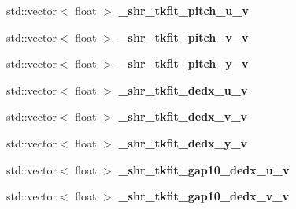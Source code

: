 \begin{DoxyCompactItemize}
\item 
std\+::vector$<$ float $>$ {\bfseries \+\_\+shr\+\_\+tkfit\+\_\+pitch\+\_\+u\+\_\+v}\hypertarget{classanalysis_1_1ShowerAnalysis_ab01e9544a4ca4faaa3331d4f3e731b17}{}\label{classanalysis_1_1ShowerAnalysis_ab01e9544a4ca4faaa3331d4f3e731b17}

\item 
std\+::vector$<$ float $>$ {\bfseries \+\_\+shr\+\_\+tkfit\+\_\+pitch\+\_\+v\+\_\+v}\hypertarget{classanalysis_1_1ShowerAnalysis_ad07e3ce7645736113700026b8984e838}{}\label{classanalysis_1_1ShowerAnalysis_ad07e3ce7645736113700026b8984e838}

\item 
std\+::vector$<$ float $>$ {\bfseries \+\_\+shr\+\_\+tkfit\+\_\+pitch\+\_\+y\+\_\+v}\hypertarget{classanalysis_1_1ShowerAnalysis_aa58d4bc5516a9a92c2c3d3e9d7c9154d}{}\label{classanalysis_1_1ShowerAnalysis_aa58d4bc5516a9a92c2c3d3e9d7c9154d}

\item 
std\+::vector$<$ float $>$ {\bfseries \+\_\+shr\+\_\+tkfit\+\_\+dedx\+\_\+u\+\_\+v}\hypertarget{classanalysis_1_1ShowerAnalysis_a3b797daec291037f040cb9fa1d6b0c03}{}\label{classanalysis_1_1ShowerAnalysis_a3b797daec291037f040cb9fa1d6b0c03}

\item 
std\+::vector$<$ float $>$ {\bfseries \+\_\+shr\+\_\+tkfit\+\_\+dedx\+\_\+v\+\_\+v}\hypertarget{classanalysis_1_1ShowerAnalysis_a942b6174c8ae763fbe0672b90abf05fa}{}\label{classanalysis_1_1ShowerAnalysis_a942b6174c8ae763fbe0672b90abf05fa}

\item 
std\+::vector$<$ float $>$ {\bfseries \+\_\+shr\+\_\+tkfit\+\_\+dedx\+\_\+y\+\_\+v}\hypertarget{classanalysis_1_1ShowerAnalysis_a0486282a97fa9e58d1b6dbf521b686dc}{}\label{classanalysis_1_1ShowerAnalysis_a0486282a97fa9e58d1b6dbf521b686dc}

\item 
std\+::vector$<$ float $>$ {\bfseries \+\_\+shr\+\_\+tkfit\+\_\+gap10\+\_\+dedx\+\_\+u\+\_\+v}\hypertarget{classanalysis_1_1ShowerAnalysis_a2e2b6fd156057d593d6deb187fdf7ce1}{}\label{classanalysis_1_1ShowerAnalysis_a2e2b6fd156057d593d6deb187fdf7ce1}

\item 
std\+::vector$<$ float $>$ {\bfseries \+\_\+shr\+\_\+tkfit\+\_\+gap10\+\_\+dedx\+\_\+v\+\_\+v}\hypertarget{classanalysis_1_1ShowerAnalysis_ae1ea7973a861942c439f22de02823768}{}\label{classanalysis_1_1ShowerAnalysis_ae1ea7973a861942c439f22de02823768}


\end{DoxyCompactItemize}
